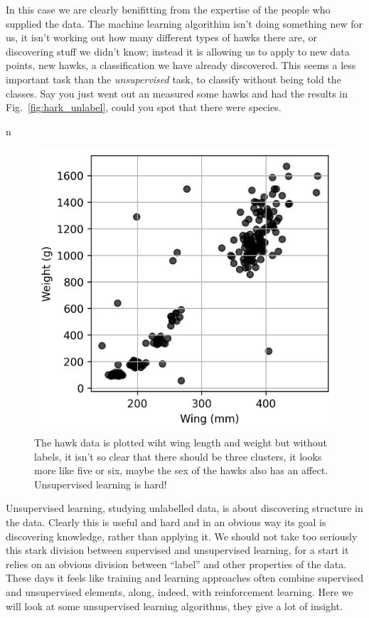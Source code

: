 \documentclass[12pt]{article}
\begin{document}
In this case we are clearly benifitting from the expertise of the
people who supplied the data. The machine learning algorithim isn't
doing something new for us, it isn't working out how many different
types of hawks there are, or discovering stuff we didn't know; instead
it is allowing us to apply to new data points, new hawks, a
classification we have already discovered. This seems a less important
task than the \textsl{unsupervised} task, to classify without being
told the classes. Say you just went out an measured some hawks and had
the results in Fig.~\ref{fig:hark_unlabel}, could you spot that there were species.


n\begin{figure}[htb]
\begin{center}  
  \includegraphics{hawks_plot_unlabel.png}
\end{center}
\caption{The hawk data is plotted wiht wing length and weight but without labels, it isn't so clear that there should be three clusters, it looks more like five or six, maybe the sex of the hawks also has an affect. Unsupervised learning is hard!\label{fig:hawks_plot}}
\end{figure}

Unsupervised learning, studying unlabelled data, is about discovering
structure in the data. Clearly this is useful and hard and in an
obvious way its goal is discovering knowledge, rather than applying
it. We should not take too seriously this stark division between
supervised and unsupervised learning, for a start it relies on an
obvious division between ``label'' and other properties of the
data. These days it feels like training and learning approaches often
combine supervised and unsupervised elements, along, indeed, with
reinforcement learning. Here we will look at some unsupervised
learning algorithms, they give a lot of insight.
\end{document}
